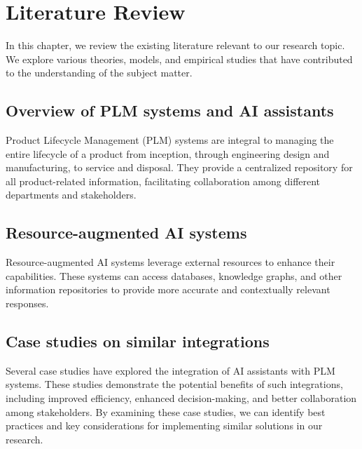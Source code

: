 \chapter{Literature Review}
\label{ch:literature-review}

In this chapter, we review the existing literature relevant to our research topic. We explore various theories, models, and empirical studies that have contributed to the understanding of the subject matter.

\section{Overview of PLM systems and AI assistants}
\label{sec:plm-systems-and-ai-assistants}

Product Lifecycle Management (PLM) systems are integral to managing the entire lifecycle of a product from inception, through engineering design and manufacturing, to service and disposal. They provide a centralized repository for all product-related information, facilitating collaboration among different departments and stakeholders.

\section{Resource-augmented AI systems}
\label{sec:resource-augmented-ai-systems}

Resource-augmented AI systems leverage external resources to enhance their capabilities. These systems can access databases, knowledge graphs, and other information repositories to provide more accurate and contextually relevant responses.

\section{Case studies on similar integrations}
\label{sec:case-studies-on-similar-integrations}

Several case studies have explored the integration of AI assistants with PLM systems. These studies demonstrate the potential benefits of such integrations, including improved efficiency, enhanced decision-making, and better collaboration among stakeholders. By examining these case studies, we can identify best practices and key considerations for implementing similar solutions in our research.
